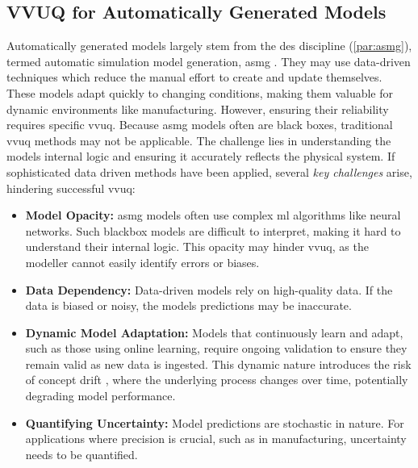 \subsection{VVUQ for Automatically Generated Models}
\label{sec:requirements-automatically-generated-models}
Automatically generated models largely stem from the \gls{des} discipline (\autoref{par:asmg}), termed automatic simulation model generation, \gls{asmg} \autocite{mildeautomated,Charpentier2014}. They may use data-driven techniques which reduce the manual effort to create and update themselves. These models adapt quickly to changing conditions, making them valuable for dynamic environments like manufacturing. However, ensuring their reliability requires specific \gls{vvuq}. Because \gls{asmg} models often are black boxes, traditional \gls{vvuq} methods may not be applicable. The challenge lies in understanding the models internal logic and ensuring it accurately reflects the physical system. If sophisticated data driven methods have been applied, several \textit{key challenges} arise, hindering successful \gls{vvuq}:

\begin{itemize}
  \item \textbf{Model Opacity:} \gls{asmg} models often use complex \gls{ml} algorithms like neural networks. Such blackbox models are difficult to interpret, making it hard to understand their internal logic. This opacity may hinder \gls{vvuq}, as the modeller cannot easily identify errors or biases.
  \item \textbf{Data Dependency:} Data-driven models rely on high-quality data. If the data is biased or noisy, the models predictions may be inaccurate.
  \item \textbf{Dynamic Model Adaptation:} Models that continuously learn and adapt, such as those using online learning, require ongoing validation to ensure they remain valid as new data is ingested. This dynamic nature introduces the risk of concept drift \autocite{lu2018learning}, where the underlying process changes over time, potentially degrading model performance.
  \item \textbf{Quantifying Uncertainty:} Model predictions are stochastic in nature. For applications where precision is crucial, such as in manufacturing, uncertainty needs to be quantified.
\end{itemize}

